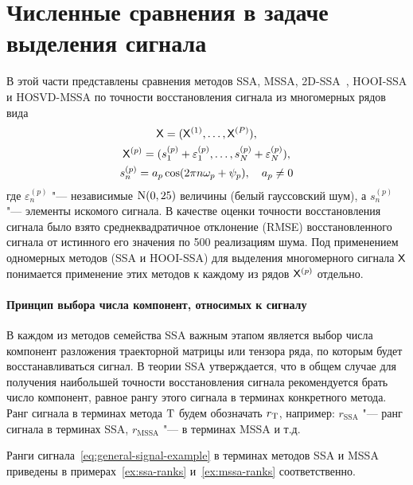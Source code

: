 \documentclass[specialist,
    substylefile = spbu.rtx,
    subf,href,colorlinks=true, 12pt]{disser}
\theoremstyle{plain}
\theoremstyle{definition}
\theoremstyle{remark}
\begin{document}
    \section{Численные сравнения в задаче выделения сигнала}\label{sec:numerical-compar}
    В этой части представлены сравнения методов SSA, MSSA, 2D-SSA~\cite{2d-ssa}, HOOI-SSA и HOSVD-MSSA
    по точности восстановления сигнала из многомерных рядов вида
    \begin{gather}
        \mathsf{X} = (\mathsf{X}^{(1)}, \ldots, \mathsf{X}^{(P)}), \nonumber \\
        \mathsf{X}^{(p)} = (s_1^{(p)} + \varepsilon_1^{(p)}, \ldots, s_N^{(p)} + \varepsilon_N^{(p)}),\nonumber \\
        s_n^{(p)} = a_p \cos(2\pi n \omega_p + \psi_p), \quad a_p \ne 0 \label{eq:general-signal-example}
    \end{gather}
    где $\varepsilon_n^{(p)}$ "--- независимые $\mathrm{N}(0, 25)$ величины (белый гауссовский шум), а
    $s_n^{(p)}$ "--- элементы искомого сигнала.
    В качестве оценки точности восстановления сигнала было взято среднеквадратичное отклонение (RMSE)
    восстановленного сигнала от истинного его значения по 500 реализациям шума.
    Под применением одномерных методов (SSA и HOOI-SSA) для выделения многомерного сигнала $\mathsf{X}$ понимается
    применение этих методов к каждому из рядов $\mathsf{X}^{(p)}$ отдельно.

    \paragraph{Принцип выбора числа компонент, относимых к сигналу}\label{subsec:example-signal-ranks}
    В каждом из методов семейства SSA важным этапом является выбор числа компонент разложения траекторной матрицы
    или тензора ряда, по которым будет восстанавливаться сигнал.
    В теории SSA утверждается, что в общем случае для получения наибольшей точности восстановления
    сигнала рекомендуется брать число компонент, равное рангу этого сигнала в терминах конкретного метода.
    Ранг сигнала в терминах метода $\mathrm{T}$ будем обозначать $r_{\mathrm{T}}$, например: $r_\text{SSA}$ "---
    ранг сигнала в терминах SSA, $r_\text{MSSA}$ "--- в терминах MSSA и т.д.
    
    Ранги сигнала~\eqref{eq:general-signal-example} в терминах методов SSA и MSSA приведены в
    примерах~\ref{ex:ssa-ranks} и~\ref{ex:mssa-ranks} соответственно.
\end{document}
